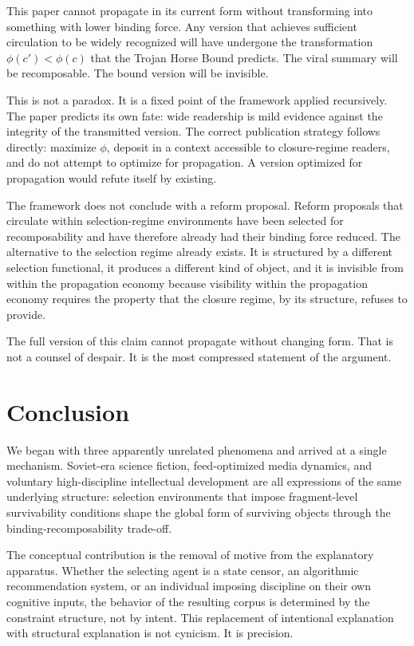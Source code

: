 \documentclass[12pt]{article}
\newcommand{\bind}{\phi}
\begin{document}
This paper cannot propagate in its current form without transforming
into something with lower binding force. Any version that achieves
sufficient circulation to be widely recognized will have undergone the
transformation $\bind(c') < \bind(c)$ that the Trojan Horse Bound
predicts. The viral summary will be recomposable. The bound version
will be invisible.

This is not a paradox. It is a fixed point of the framework applied
recursively. The paper predicts its own fate: wide readership is mild
evidence against the integrity of the transmitted version. The correct
publication strategy follows directly: maximize $\bind$, deposit in a
context accessible to closure-regime readers, and do not attempt to
optimize for propagation. A version optimized for propagation would
refute itself by existing.

The framework does not conclude with a reform proposal. Reform proposals
that circulate within selection-regime environments have been selected
for recomposability and have therefore already had their binding force
reduced. The alternative to the selection regime already exists. It is
structured by a different selection functional, it produces a different
kind of object, and it is invisible from within the propagation economy
because visibility within the propagation economy requires the property
that the closure regime, by its structure, refuses to provide.

The full version of this claim cannot propagate without changing form.
That is not a counsel of despair. It is the most compressed statement
of the argument.

\section{Conclusion}
\label{sec:conclusion}

We began with three apparently unrelated phenomena and arrived at a
single mechanism. Soviet-era science fiction, feed-optimized media
dynamics, and voluntary high-discipline intellectual development are all
expressions of the same underlying structure: selection environments
that impose fragment-level survivability conditions shape the global
form of surviving objects through the binding-recomposability trade-off.

The conceptual contribution is the removal of motive from the
explanatory apparatus. Whether the selecting agent is a state censor,
an algorithmic recommendation system, or an individual imposing
discipline on their own cognitive inputs, the behavior of the resulting
corpus is determined by the constraint structure, not by intent. This
replacement of intentional explanation with structural explanation is
not cynicism. It is precision.
\end{document}
